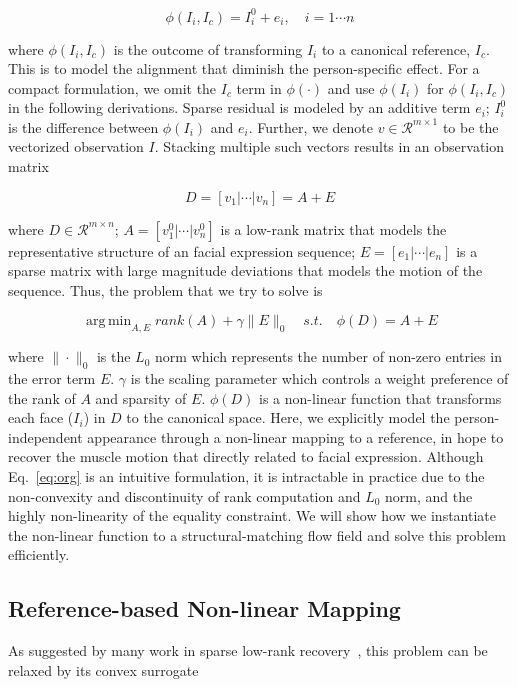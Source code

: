 \documentclass[journal]{IEEEtran}
\DeclareMathOperator*{\argmin}{arg\,min}
\begin{document}
\begin{equation}
\phi(I_i,I_c) = I^{0}_i + e_i,\quad i = 1\cdots n
\end{equation}

\noindent where $\phi(I_i,I_c)$ is the outcome of transforming $I_i$ to a canonical reference, $I_c$. This is to model the alignment that diminish the person-specific effect. For a compact formulation, we omit the $I_c$ term in $\phi(\cdot)$ and use $\phi(I_i)$ for $\phi(I_i,I_c)$ in the following derivations. Sparse residual is modeled by an additive term $e_i$; $I^{0}_i$ is the difference between $\phi(I_i)$ and $e_i$. Further, we denote $v\in\mathscr{R}^{m\times 1}$ to be the vectorized observation $I$. Stacking multiple such vectors results in an observation matrix

\begin{equation}
D = [v_1 | \cdots | v_n] = A + E
\end{equation}

\noindent where $D\in\mathscr{R}^{m\times n}$; $A = [v^{0}_{1} | \cdots | v^{0}_{n}]$ is a low-rank matrix that models the representative structure of an facial expression sequence; $E = [e_{1} | \cdots | e_{n}]$ is a sparse matrix with large magnitude deviations that models the motion of the sequence. Thus, the problem that we try to solve is

\begin{equation} \label{eq:org}
\argmin_{A,E} rank(A)+\gamma \|E\|_0  \quad s.t. \quad \phi (D) = A + E 
\end{equation}

\noindent where $\|\cdot\|_0$ is the $L_0$ norm which represents the number of non-zero entries in the error term $E$. $\gamma$ is the scaling parameter which controls a weight preference of the rank of $A$ and sparsity of $E$. $\phi (D)$ is a non-linear function that transforms each face ($I_i$) in $D$ to the canonical space. Here, we explicitly model the person-independent appearance through a non-linear mapping to a reference, in hope to recover the muscle motion that directly related to facial expression. Although Eq.~\ref{eq:org} is an intuitive formulation, it is intractable in practice due to the non-convexity and discontinuity of rank computation and $L_0$ norm, and the highly non-linearity of the equality constraint. We will show how we instantiate the non-linear function to a structural-matching flow field and solve this problem efficiently.

\subsection{Reference-based Non-linear Mapping} 
As suggested by many work in sparse low-rank recovery~\cite{Candes11,Lin09,Peng_CVPR10}, this problem can be relaxed by its convex surrogate
\end{document}
